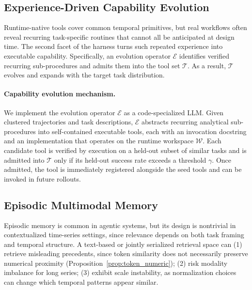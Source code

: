 \subsection{Experience-Driven Capability Evolution}
\label{sec:evolve}

Runtime-native tools cover common temporal primitives, but real workflows often reveal recurring task-specific routines that cannot all be anticipated at design time.
The second facet of the harness turns such repeated experience into executable capability. Specifically, an evolution operator $\mathcal{E}$ identifies verified recurring sub-procedures and admits them into the tool set $\mathcal{T}$. As a result, $\mathcal{T}$ evolves and expands with the target task distribution.


\paragraph{Capability evolution mechanism.}
We implement the evolution operator $\mathcal{E}$ as a code-specialized LLM. Given clustered trajectories and task descriptions, $\mathcal{E}$ abstracts recurring analytical sub-procedures into self-contained executable tools, each with an invocation docstring and an implementation that operates on the runtime workspace $\mathcal{W}$. Each candidate tool is verified by execution on a held-out subset of similar tasks and is admitted into $\mathcal{T}$ only if its held-out success rate exceeds a threshold $\gamma$. Once admitted, the tool is immediately registered alongside the seed tools and can be invoked in future rollouts.




\subsection{Episodic Multimodal Memory}
\label{sec:memory}




Episodic memory is common in agentic systems, but its design is nontrivial in contextualized time-series settings, since relevance depends on both task framing and temporal structure. A text-based or jointly serialized retrieval space can (1) retrieve misleading precedents, since token similarity does not necessarily preserve numerical proximity (Proposition~\ref{prop:token_numeric}); (2) risk modality imbalance for long series; (3) exhibit scale instability, as normalization choices can change which temporal patterns appear similar.

